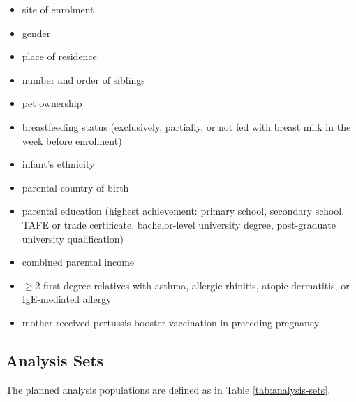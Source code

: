 \documentclass{bmcart}
\begin{document}
\begin{itemize}
	\item site of enrolment
	\item gender
	\item place of residence
	\item number and order of siblings
	\item pet ownership
	\item breastfeeding status (exclusively, partially, or not fed with breast milk in the week before enrolment)
	\item infant's ethnicity
	\item parental country of birth
	\item parental education (highest achievement: primary school, secondary school, TAFE or trade certificate, bachelor-level university degree, post-graduate university qualification)
	\item combined parental income
	\item $\geq$2 first degree relatives with asthma, allergic rhinitis, atopic dermatitis, or IgE-mediated allergy
	\item mother received pertussis booster vaccination in preceding pregnancy
\end{itemize}

\subsection*{Analysis Sets}

The planned analysis populations are defined as in Table \ref{tab:analysis-sets}.
\end{document}
